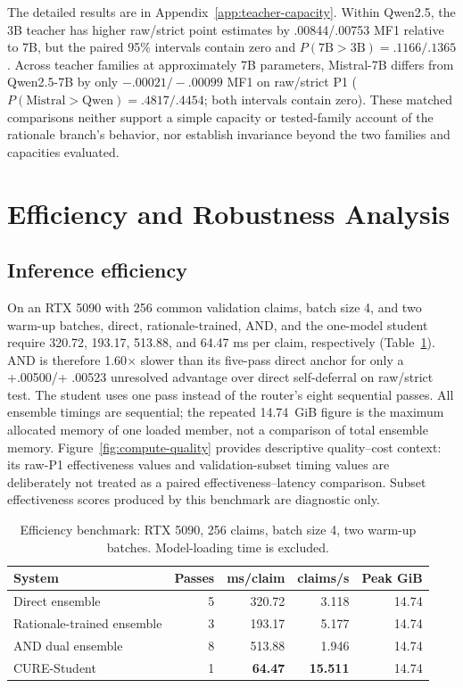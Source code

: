 \documentclass[11pt]{article}
\begin{document}
The detailed results are in Appendix~\ref{app:teacher-capacity}. Within Qwen2.5, the 3B teacher has higher raw/strict point estimates by .00844/.00753 MF1 relative to 7B, but the paired 95\% intervals contain zero and $P(7\mathrm{B}>3\mathrm{B})=.1166/.1365$. Across teacher families at approximately 7B parameters, Mistral-7B differs from Qwen2.5-7B by only $-.00021/-.00099$ MF1 on raw/strict P1 ($P(\mathrm{Mistral}>\mathrm{Qwen})=.4817/.4454$; both intervals contain zero). These matched comparisons neither support a simple capacity or tested-family account of the rationale branch's behavior, nor establish invariance beyond the two families and capacities evaluated.

\section{Efficiency and Robustness Analysis}
\subsection{Inference efficiency}
On an RTX 5090 with 256 common validation claims, batch size 4, and two warm-up batches, direct, rationale-trained, AND, and the one-model student require 320.72, 193.17, 513.88, and 64.47 ms per claim, respectively (Table~\ref{tab:efficiency}). AND is therefore 1.60$\times$ slower than its five-pass direct anchor for only a +.00500/+ .00523 unresolved advantage over direct self-deferral on raw/strict test. The student uses one pass instead of the router's eight sequential passes. All ensemble timings are sequential; the repeated 14.74~GiB figure is the maximum allocated memory of one loaded member, not a comparison of total ensemble memory. Figure~\ref{fig:compute-quality} provides descriptive quality--cost context: its raw-P1 effectiveness values and validation-subset timing values are deliberately not treated as a paired effectiveness--latency comparison. Subset effectiveness scores produced by this benchmark are diagnostic only.

\begin{table}[t]
\centering\scriptsize
\begin{tabular}{@{}lrrrr@{}}
\toprule
System & Passes & ms/claim & claims/s & Peak GiB\\
\midrule
Direct ensemble & 5 & 320.72 & 3.118 & 14.74\\
Rationale-trained ensemble & 3 & 193.17 & 5.177 & 14.74\\
AND dual ensemble & 8 & 513.88 & 1.946 & 14.74\\
CURE-Student & 1 & \textbf{64.47} & \textbf{15.511} & 14.74\\
\bottomrule
\end{tabular}
\caption{Efficiency benchmark: RTX 5090, 256 claims, batch size 4, two warm-up batches. Model-loading time is excluded.}\label{tab:efficiency}
\end{table}
\end{document}
